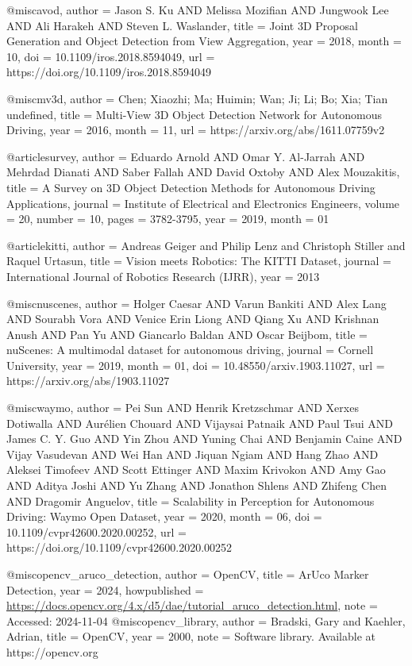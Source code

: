 \begin{bibtex-entries}
@misc{avod,
author = {Jason S. Ku AND Melissa Mozifian AND Jungwook Lee AND Ali Harakeh AND Steven L. Waslander},
title = {Joint 3D Proposal Generation and Object Detection from View Aggregation},
year = {2018},
month = {10},
doi = {10.1109/iros.2018.8594049},
url = {https://doi.org/10.1109/iros.2018.8594049}
}

@misc{mv3d,
author = {Chen; Xiaozhi; Ma; Huimin; Wan; Ji; Li; Bo; Xia; Tian undefined},
title = {Multi-View 3D Object Detection Network for Autonomous Driving},
year = {2016},
month = {11},
url = {https://arxiv.org/abs/1611.07759v2}
}

@article{survey,
author = {Eduardo Arnold AND Omar Y. Al-Jarrah AND Mehrdad Dianati AND Saber Fallah AND David Oxtoby AND Alex Mouzakitis},
title = {A Survey on 3D Object Detection Methods for Autonomous Driving Applications},
journal = {Institute of Electrical and Electronics Engineers},
volume = {20},
number = {10},
pages = {3782-3795},
year = {2019},
month = {01}
}

@article{kitti,
  author = {Andreas Geiger and Philip Lenz and Christoph Stiller and Raquel Urtasun},
  title = {Vision meets Robotics: The KITTI Dataset},
  journal = {International Journal of Robotics Research (IJRR)},
  year = {2013}
}

@misc{nuscenes,
author = {Holger Caesar AND Varun Bankiti AND Alex Lang AND Sourabh Vora AND Venice Erin Liong AND Qiang Xu AND Krishnan Anush AND Pan Yu AND Giancarlo Baldan AND Oscar Beijbom},
title = {nuScenes: A multimodal dataset for autonomous driving},
journal = {Cornell University},
year = {2019},
month = {01},
doi = {10.48550/arxiv.1903.11027},
url = {https://arxiv.org/abs/1903.11027}
}

@misc{waymo,
author = {Pei Sun AND Henrik Kretzschmar AND Xerxes Dotiwalla AND Aurélien Chouard AND Vijaysai Patnaik AND Paul Tsui AND James C. Y. Guo AND Yin Zhou AND Yuning Chai AND Benjamin Caine AND Vijay Vasudevan AND Wei Han AND Jiquan Ngiam AND Hang Zhao AND Aleksei Timofeev AND Scott Ettinger AND Maxim Krivokon AND Amy Gao AND Aditya Joshi AND Yu Zhang AND Jonathon Shlens AND Zhifeng Chen AND Dragomir Anguelov},
title = {Scalability in Perception for Autonomous Driving: Waymo Open Dataset},
year = {2020},
month = {06},
doi = {10.1109/cvpr42600.2020.00252},
url = {https://doi.org/10.1109/cvpr42600.2020.00252}
}

@misc{opencv_aruco_detection,
  author       = {OpenCV},
  title        = {ArUco Marker Detection},
  year         = {2024},
  howpublished = {\url{https://docs.opencv.org/4.x/d5/dae/tutorial_aruco_detection.html}},
  note         = {Accessed: 2024-11-04}
}
@misc{opencv_library,
  author = {Bradski, Gary and Kaehler, Adrian},
  title = {OpenCV},
  year = {2000},
  note = {Software library. Available at https://opencv.org}
}
\end{bibtex-entries}